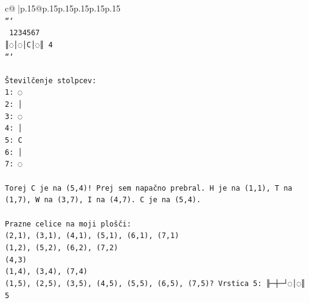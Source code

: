 \documentclass{article}
\begin{document}
{\begin{supertabular}{c@{$\;$}|p{.15\linewidth}@{}p{.15\linewidth}p{.15\linewidth}p{.15\linewidth}p{.15\linewidth}p{.15\linewidth}}
{{{\\ 
\texttt{```} \\
\texttt{ 1234567} \\
\texttt{║◌│◌│C│◌║ 4} \\
\texttt{```} \\
\\ 
\texttt{Številčenje stolpcev:} \\
\texttt{1: ◌} \\
\texttt{2: │} \\
\texttt{3: ◌} \\
\texttt{4: │} \\
\texttt{5: C} \\
\texttt{6: │} \\
\texttt{7: ◌} \\
\\ 
\texttt{Torej C je na (5,4)! Prej sem napačno prebral. H je na (1,1), T na (1,7), W na (3,7), I na (4,7). C je na (5,4).} \\
\\ 
\texttt{Prazne celice na moji plošči:} \\
\texttt{(2,1), (3,1), (4,1), (5,1), (6,1), (7,1)} \\
\texttt{(1,2), (5,2), (6,2), (7,2)} \\
\texttt{(4,3)} \\
\texttt{(1,4), (3,4), (7,4)} \\
\texttt{(1,5), (2,5), (3,5), (4,5), (5,5), (6,5), (7,5)? Vrstica 5: ╟─┼─┘◌│◌║ 5} \\
            }
        }
    }
     \\ \\


\end{supertabular}}
\end{document}
